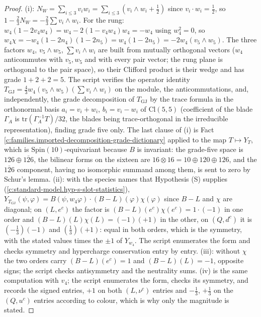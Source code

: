 \documentclass[11pt]{article}
\theoremstyle{definition}
\theoremstyle{plain}
\providecommand{\Cl}{}\renewcommand{\Cl}{\mathrm{Cl}}
\begin{document}
\begin{proof}
(i): $N_{W} = \sum_{i\le3} v_{i}w_{i} = \sum_{i\le3}(v_{i}\wedge w_{i} + \tfrac12)$ since $v_{i}\cdot w_{i} = \tfrac12$, so $1 - \tfrac23 N_{W} = -\tfrac23\sum v_{i}\wedge w_{i}$. For the rung: $w_{4}(1 - 2v_{4}w_{4}) = w_{4} - 2(1 - v_{4}w_{4})w_{4} = -w_{4}$ using $w_{4}^{2} = 0$, so $w_{4}\chi = -w_{4}(1 - 2n_{4})(1 - 2n_{5}) = w_{4}(1 - 2n_{5}) = -2w_{4}(v_{5}\wedge w_{5})$. The three factors $w_{4}$, $v_{5}\wedge w_{5}$, $\sum v_{i}\wedge w_{i}$ are built from mutually orthogonal vectors ($w_{4}$ anticommutes with $v_{5}, w_{5}$ and with every pair vector; the rung plane is orthogonal to the pair space), so their Clifford product is their wedge and has grade $1 + 2 + 2 = 5$. The script verifies the operator identity $T_{\mathrm{GJ}} = \tfrac43 w_{4}(v_{5}\wedge w_{5})(\sum v_{i}\wedge w_{i})$ on the module, the anticommutations, and, independently, the grade decomposition of $T_{\mathrm{GJ}}$ by the trace formula in the orthonormal basis $a_{i} = v_{i} + w_{i}$, $b_{i} = v_{i} - w_{i}$ of $\Cl(5,5)$ (coefficient of the blade $\Gamma_{A}$ is $\mathrm{tr}(\Gamma_{A}^{-1}T)/32$, the blades being trace-orthogonal in the irreducible representation), finding grade five only. The last clause of (i) is Fact \ref{c:families.imported-decomposition-grade-dictionary} applied to the map $T \mapsto Y_{T}$, which is $\mathrm{Spin}(10)$-equivariant because $B$ is invariant: the grade-five space is $126 \oplus \overline{126}$, the bilinear forms on the sixteen are $16 \otimes 16 = 10 \oplus 120 \oplus 126$, and the $\overline{126}$ component, having no isomorphic summand among them, is sent to zero by Schur's lemma. (ii): with the species names that Hypothesis (S) supplies (\ref{c:standard-model.hyp-s-slot-statistics}), $Y_{T_{\mathrm{GJ}}}(\psi, \varphi) = B(\psi, w_{4}\varphi)\cdot(B - L)(\varphi)\chi(\varphi)$ since $B - L$ and $\chi$ are diagonal; on $(L, e^{c})$ the factor is $(B-L)(e^{c})\chi(e^{c}) = 1\cdot(-1)$ in one order and $(B-L)(L)\chi(L) = (-1)(+1)$ in the other, on $(Q, d^{c})$ it is $(-\tfrac13)(-1)$ and $(\tfrac13)(+1)$: equal in both orders, which is the symmetry, with the stated values times the $\pm1$ of $Y_{w_{4}}$. The script enumerates the form and checks symmetry and hypercharge conservation entry by entry. (iii): without $\chi$ the two orders carry $(B-L)(e^{c}) = 1$ and $(B-L)(L) = -1$, opposite signs; the script checks antisymmetry and the neutrality sums. (iv) is the same computation with $v_{4}$; the script enumerates the form, checks its symmetry, and records the signed entries, $+1$ on both $(L, \nu^{c})$ entries and $-\tfrac13$, $+\tfrac13$ on the $(Q, u^{c})$ entries according to colour, which is why only the magnitude is stated.

\end{proof}
\end{document}
